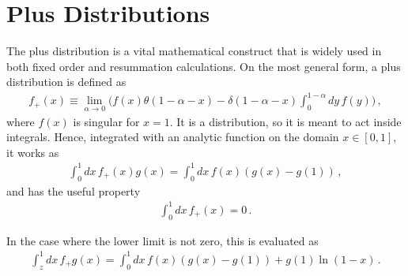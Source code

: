 \section{Plus Distributions}\label{sec:Appendix Plus Distributions}
The plus distribution is a vital mathematical construct that is widely used in both fixed order and resummation calculations. On the most general form, a plus distribution is defined as
\begin{align}
    f_{+}(x)\equiv\lim_{\alpha\rightarrow 0}\Big(f(x)\theta(1-\alpha-x)-\delta(1-\alpha-x)\int_{0}^{1-\alpha}dy\,f(y)\Big)\,,
\end{align}
where $f(x)$ is singular for $x=1$. It is a distribution, so it is meant to act inside integrals. Hence, integrated with an analytic function on the domain $x\in[0,1]$, it works as
\begin{align}\label{eq:plus distribution convolution}
    \int_{0}^{1}dx\,f_{+}(x)g(x)=\int_{0}^{1}dx\,f(x)(g(x)-g(1))\,,
\end{align}
and has the useful property
\begin{align}\label{eq:plus distribution integrated over unity}
    \int_{0}^{1}dx\,f_{+}(x)=0\,.
\end{align}

In the case where the lower limit is not zero, this is evaluated as
\begin{align}
    \int_{z}^{1}dx\,f_{+}g(x)=\int_{0}^{1}dx\,f(x)(g(x)-g(1))+g(1)\ln(1-x)\,.
\end{align}

